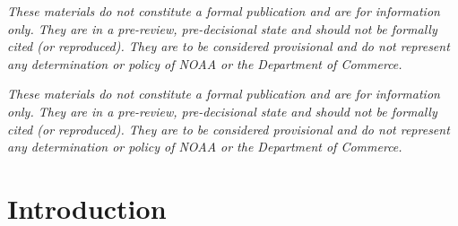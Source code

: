 \documentclass[11pt,
  english,
  a4paper,
]{article}
\begin{document}
\newcommand{\lt}{\ensuremath <}
\newcommand{\gt}{\ensuremath >}


\vspace{20cm}


\emph{These materials do not constitute a formal publication and are for information only. They are in a pre-review, pre-decisional state and should not be formally cited (or reproduced). They are to be considered provisional and do not represent any determination or policy of NOAA or the Department of Commerce.}

\leavevmode\tagmcend\tagstructend\par

\pagebreak
{}
\setcounter{page}{1}

\renewcommand{\thetable}{\roman{table}}
\renewcommand{\thefigure}{\roman{figure}}

\setlength\parskip{0.5em plus 0.1em minus 0.2em}

\vspace{40cm}


\emph{These materials do not constitute a formal publication and are for information only. They are in a pre-review, pre-decisional state and should not be formally cited (or reproduced). They are to be considered provisional and do not represent any determination or policy of NOAA or the Department of Commerce.}

\leavevmode\tagmcend\tagstructend\par

\pagebreak
\setlength{\parskip}{5mm plus1mm minus1mm}
\setcounter{page}{1}
\renewcommand{\thetable}{\arabic{table}}
\renewcommand{\thefigure}{\arabic{figure}}
\setcounter{table}{0}
\setcounter{figure}{0}

\setlength\parskip{0.5em plus 0.1em minus 0.2em}


\hypertarget{introduction}{%
\section{Introduction}\label{introduction}}

\leavevmode\tagmcend\tagstructend
\end{document}
